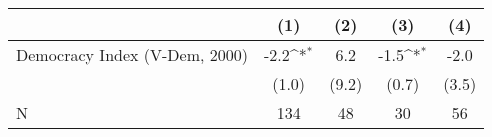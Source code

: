 {
\def\sym#1{\ifmmode^{#1}\else\(^{#1}\)\fi}
\begin{tabular}{l*{4}{c}}
\hline\hline
                    &\multicolumn{1}{c}{(1)}         &\multicolumn{1}{c}{(2)}         &\multicolumn{1}{c}{(3)}         &\multicolumn{1}{c}{(4)}         \\
\hline
Democracy Index (V-Dem, 2000)&        -2.2\sym{*}  &         6.2         &        -1.5\sym{*}  &        -2.0         \\
                    &       (1.0)         &       (9.2)         &       (0.7)         &       (3.5)         \\
\hline
N                   &         134         &          48         &          30         &          56         \\
\hline\hline
\end{tabular}
}

